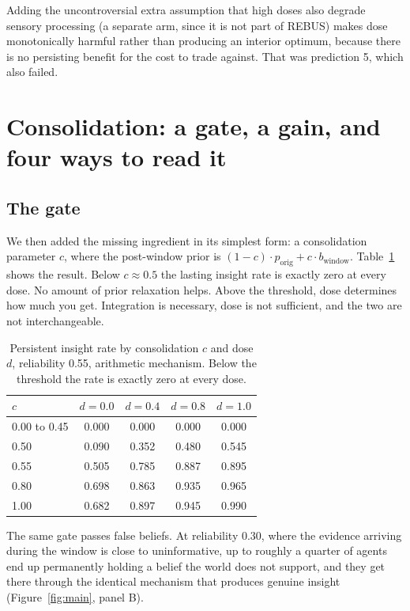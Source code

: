 \documentclass[11pt]{article}
\begin{document}
Adding the uncontroversial extra assumption that high doses also degrade sensory
processing (a separate arm, since it is not part of REBUS) makes dose monotonically
harmful rather than producing an interior optimum, because there is no persisting
benefit for the cost to trade against. That was prediction 5, which also failed.

\section{Consolidation: a gate, a gain, and four ways to read it}
\label{sec:robustness}

\subsection{The gate}

We then added the missing ingredient in its simplest form: a consolidation parameter
$c$, where the post-window prior is $(1-c) \cdot p_{\text{orig}} + c \cdot
b_{\text{window}}$. Table~\ref{tab:gate} shows the result. Below $c \approx 0.5$ the
lasting insight rate is exactly zero at every dose. No amount of prior relaxation
helps. Above the threshold, dose determines how much you get. Integration is
necessary, dose is not sufficient, and the two are not interchangeable.

\begin{table}[t]
\centering
\caption{Persistent insight rate by consolidation $c$ and dose $d$, reliability 0.55,
arithmetic mechanism. Below the threshold the rate is exactly zero at every dose.}
\label{tab:gate}
\begin{tabular}{lcccc}
\toprule
$c$ & $d=0.0$ & $d=0.4$ & $d=0.8$ & $d=1.0$ \\
\midrule
0.00 to 0.45 & 0.000 & 0.000 & 0.000 & 0.000 \\
0.50 & 0.090 & 0.352 & 0.480 & 0.545 \\
0.55 & 0.505 & 0.785 & 0.887 & 0.895 \\
0.80 & 0.698 & 0.863 & 0.935 & 0.965 \\
1.00 & 0.682 & 0.897 & 0.945 & 0.990 \\
\bottomrule
\end{tabular}
\end{table}

The same gate passes false beliefs. At reliability 0.30, where the evidence arriving
during the window is close to uninformative, up to roughly a quarter of agents end up
permanently holding a belief the world does not support, and they get there through
the identical mechanism that produces genuine insight
(Figure~\ref{fig:main}, panel B).
\end{document}
